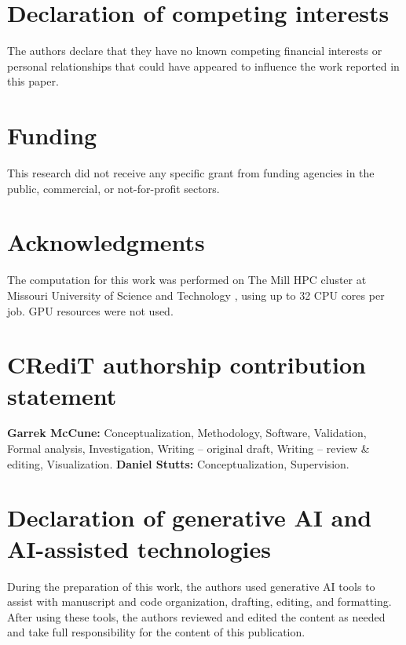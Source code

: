 \documentclass[11pt]{article}
\begin{document}
\section*{Declaration of competing interests}
The authors declare that they have no known competing financial interests
or personal relationships that could have appeared to influence the work
reported in this paper.

\section*{Funding}
This research did not receive any specific grant from funding agencies in
the public, commercial, or not-for-profit sectors.

\section*{Acknowledgments}
The computation for this work was performed on The Mill HPC cluster at
Missouri University of Science and Technology \cite{mill2024}, using up
to 32 CPU cores per job. GPU resources were not used.

\section*{CRediT authorship contribution statement}
\textbf{Garrek McCune:} Conceptualization, Methodology, Software,
Validation, Formal analysis, Investigation, Writing -- original draft,
Writing -- review \& editing, Visualization. \textbf{Daniel Stutts:}
Conceptualization, Supervision.

\section*{Declaration of generative AI and AI-assisted technologies}
During the preparation of this work, the authors used generative AI tools
to assist with manuscript and code organization, drafting, editing, and
formatting. After using these tools, the authors reviewed and edited the
content as needed and take full responsibility for the content of this
publication.
\normalsize
\end{document}
